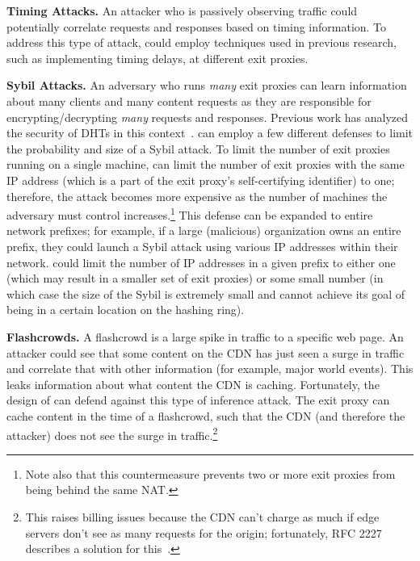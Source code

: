 \textbf{Timing Attacks.} An attacker who is passively observing traffic could potentially 
correlate requests and responses based on timing information.  To address this type of attack, 
\system{} could employ techniques used in previous research, such as implementing timing 
delays, at different exit proxies.

\textbf{Sybil Attacks.} An adversary who runs {\it many} exit proxies can learn information 
about many clients and many content requests as they are responsible for encrypting/decrypting 
{\it many} requests and responses.  Previous work has analyzed the security of DHTs in this 
context~\cite{geambasu2009experiences,wolchok2010defeating}.  \system{} can employ a few different defenses to limit the probability and size 
of a Sybil attack.  To limit the number of exit proxies running on a single machine, \system{} can 
limit the number of exit proxies with the same IP address (which is a part of the exit proxy's self-certifying 
identifier) to one; therefore, the attack becomes more 
expensive as the number of machines the adversary must control increases.\footnote{Note also that this 
countermeasure prevents two or more exit proxies from being behind the same NAT.}  This defense can be 
expanded to entire network prefixes; for example, if a large (malicious) organization owns an entire prefix, 
they could launch a Sybil attack using various IP addresses within their network.  \system{} could 
limit the number of IP addresses in a given prefix to either one (which may result in a smaller set of 
exit proxies) or some small number (in which case the size of the Sybil is extremely small and cannot achieve 
its goal of being in a certain location on the hashing ring).  

\textbf{Flashcrowds.}  A flashcrowd is a large spike in traffic to a specific web
page. An attacker
could see that some content on the CDN has just seen a surge in traffic and correlate that with 
other information (for example, major world events).  This leaks information about what content the 
CDN is caching.  Fortunately, the design of \system{} can defend against this type of inference attack.  
The exit proxy can cache content in the time of a flashcrowd, such that the CDN (and therefore the attacker) 
does not see the surge in traffic.\footnote{This raises billing issues because the CDN can’t charge as much if edge servers don’t see as many requests for the origin; fortunately, RFC 2227 describes a solution for this~\cite{rfc2227}.}  
